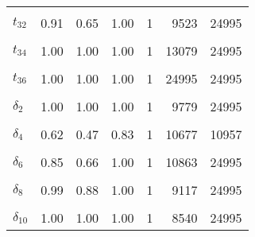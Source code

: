 \begin{table}
\begin{tabular}[t]{lrrrrrr}
\cellcolor{gray!6}{$t_{31}$} & \cellcolor{gray!6}{0.66} & \cellcolor{gray!6}{0.47} & \cellcolor{gray!6}{0.90} & \cellcolor{gray!6}{1} & \cellcolor{gray!6}{10866} & \cellcolor{gray!6}{11102}\\
$t_{32}$ & 0.91 & 0.65 & 1.00 & 1 & 9523 & 24995\\
\cellcolor{gray!6}{$t_{33}$} & \cellcolor{gray!6}{0.96} & \cellcolor{gray!6}{0.72} & \cellcolor{gray!6}{1.00} & \cellcolor{gray!6}{1} & \cellcolor{gray!6}{8190} & \cellcolor{gray!6}{24995}\\
$t_{34}$ & 1.00 & 1.00 & 1.00 & 1 & 13079 & 24995\\
\cellcolor{gray!6}{$t_{35}$} & \cellcolor{gray!6}{1.00} & \cellcolor{gray!6}{1.00} & \cellcolor{gray!6}{1.00} & \cellcolor{gray!6}{1} & \cellcolor{gray!6}{11526} & \cellcolor{gray!6}{24995}\\
$t_{36}$ & 1.00 & 1.00 & 1.00 & 1 & 24995 & 24995\\
\cellcolor{gray!6}{$\delta_{1}$} & \cellcolor{gray!6}{1.00} & \cellcolor{gray!6}{1.00} & \cellcolor{gray!6}{1.00} & \cellcolor{gray!6}{1} & \cellcolor{gray!6}{10667} & \cellcolor{gray!6}{24995}\\
$\delta_{2}$ & 1.00 & 1.00 & 1.00 & 1 & 9779 & 24995\\
\cellcolor{gray!6}{$\delta_{3}$} & \cellcolor{gray!6}{0.98} & \cellcolor{gray!6}{0.84} & \cellcolor{gray!6}{1.00} & \cellcolor{gray!6}{1} & \cellcolor{gray!6}{8309} & \cellcolor{gray!6}{24995}\\
$\delta_{4}$ & 0.62 & 0.47 & 0.83 & 1 & 10677 & 10957\\
\cellcolor{gray!6}{$\delta_{5}$} & \cellcolor{gray!6}{1.00} & \cellcolor{gray!6}{1.00} & \cellcolor{gray!6}{1.00} & \cellcolor{gray!6}{1} & \cellcolor{gray!6}{4348} & \cellcolor{gray!6}{24995}\\
$\delta_{6}$ & 0.85 & 0.66 & 1.00 & 1 & 10863 & 24995\\
\cellcolor{gray!6}{$\delta_{7}$} & \cellcolor{gray!6}{1.00} & \cellcolor{gray!6}{1.00} & \cellcolor{gray!6}{1.00} & \cellcolor{gray!6}{1} & \cellcolor{gray!6}{4348} & \cellcolor{gray!6}{24995}\\
$\delta_{8}$ & 0.99 & 0.88 & 1.00 & 1 & 9117 & 24995\\
\cellcolor{gray!6}{$\delta_{9}$} & \cellcolor{gray!6}{1.00} & \cellcolor{gray!6}{1.00} & \cellcolor{gray!6}{1.00} & \cellcolor{gray!6}{1} & \cellcolor{gray!6}{5928} & \cellcolor{gray!6}{24995}\\
$\delta_{10}$ & 1.00 & 1.00 & 1.00 & 1 & 8540 & 24995\\

\end{tabular}
\end{table}
